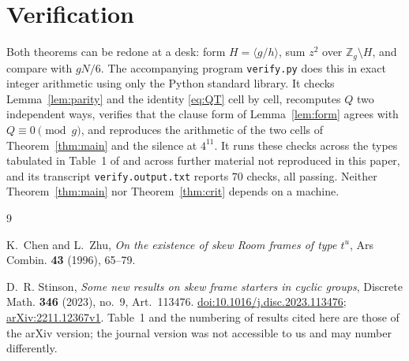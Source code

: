 \documentclass[11pt]{amsart}
\theoremstyle{remark}
\begin{document}
\section{Verification}

Both theorems can be redone at a desk: form $H=\langle g/h\rangle$, sum
$z^{2}$ over $\mathbb Z_g\setminus H$, and compare with $gN/6$. The
accompanying program \texttt{verify.py} does this in exact integer arithmetic
using only the Python standard library. It checks Lemma~\ref{lem:parity} and
the identity \eqref{eq:QT} cell by cell, recomputes $Q$ two independent ways,
verifies that the clause form of Lemma~\ref{lem:form} agrees with
$Q\equiv0\pmod g$, and reproduces the arithmetic of the two cells of
Theorem~\ref{thm:main} and the silence at $4^{11}$. It runs these checks
across the types tabulated in Table~1 of \cite{Stinson23} and across further
material not reproduced in this paper, and its transcript
\texttt{verify.output.txt} reports $70$ checks, all passing. Neither
Theorem~\ref{thm:main} nor Theorem~\ref{thm:crit} depends on a machine.

\begin{thebibliography}{9}

K.~Chen and L.~Zhu,
\emph{On the existence of skew Room frames of type $t^{u}$},
Ars Combin. \textbf{43} (1996), 65--79.

D.~R. Stinson,
\emph{Some new results on skew frame starters in cyclic groups},
Discrete Math. \textbf{346} (2023), no.~9, Art.~113476.
\href{https://doi.org/10.1016/j.disc.2023.113476}{doi:10.1016/j.disc.2023.113476};
\href{https://arxiv.org/abs/2211.12367v1}{arXiv:2211.12367v1}. Table~1 and the
numbering of results cited here are those of the arXiv version; the journal
version was not accessible to us and may number differently.

\end{thebibliography}
\end{document}
